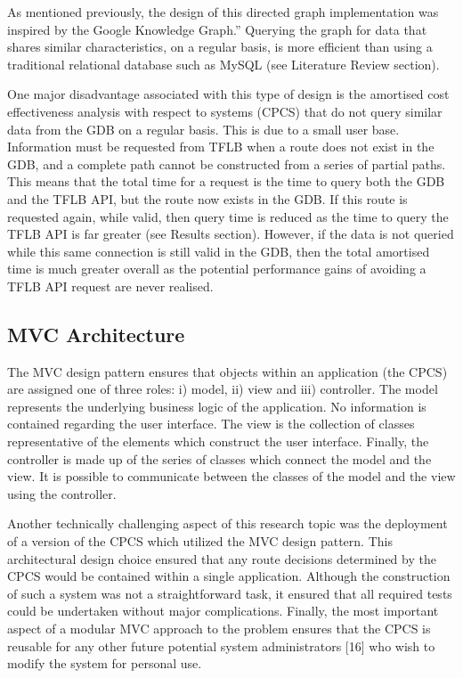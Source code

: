 \documentclass[12pt]{article}   	%
\begin{document}
As mentioned previously, the design of this directed graph implementation was inspired by the Google Knowledge Graph.” Querying the graph for data that shares similar characteristics, on a regular basis, is more efficient than using a traditional relational database such as MySQL (see Literature Review section).

One major disadvantage associated with this type of design is the amortised cost effectiveness analysis with respect to systems (CPCS) that do not query similar data from the GDB on a regular basis. This is due to a small user base. Information must be requested from TFLB when a route does not exist in the GDB, and a complete path cannot be constructed from a series of partial paths. This means that the total time for a request is the time to query both the GDB and the TFLB API, but the route now exists in the GDB. If this route is requested again, while valid, then query time is reduced as the time to query the TFLB API is far greater (see Results section). However, if the data is not queried while this same connection is still valid in the GDB, then the total amortised time is much greater overall as the potential performance gains of avoiding a TFLB API request are never realised.

\newpage

\subsection{MVC Architecture}
The MVC design pattern ensures that objects within an application (the CPCS) are assigned one of three roles: i) model, ii) view and iii) controller. The model represents the underlying business logic of the application. No information is contained regarding the user interface. The view is the collection of classes representative of the elements which construct the user interface. Finally, the controller is made up of the series of classes which connect the model and the view. It is possible to communicate between the classes of the model and the view using the controller.

Another technically challenging aspect of this research topic was the deployment of a version of the CPCS which utilized the MVC design pattern. This architectural design choice ensured that any route decisions determined by the CPCS would be contained within a single application. Although the construction of such a system was not a straightforward task, it ensured that all required tests could be undertaken without major complications. Finally, the most important aspect of a modular MVC approach to the problem ensures that the CPCS is reusable for any other future potential system administrators [16] who wish to modify the system for personal use.
\end{document}
